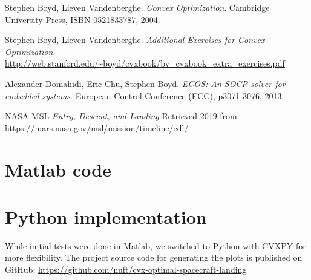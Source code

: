 \documentclass[12pt, letterpaper]{article}
\begin{document}
\begin{thebibliography}{1}

Stephen Boyd, Lieven Vandenberghe.
\textit{Convex Optimization}.
Cambridge University Press, ISBN 0521833787, 2004.

Stephen Boyd, Lieven Vandenberghe.
\textit{Additional Exercises for Convex Optimization}.
\url{http://web.stanford.edu/~boyd/cvxbook/bv_cvxbook_extra_exercises.pdf}

Alexander Domahidi, Eric Chu, Stephen Boyd.
\textit{ECOS: An SOCP solver for embedded systems}.
European Control Conference (ECC), p3071-3076, 2013.

NASA MSL
\textit{Entry, Descent, and Landing}
Retrieved 2019 from \url{https://mars.nasa.gov/msl/mission/timeline/edl/}

\end{thebibliography}

\newpage
\appendix
\section{Matlab code}
\label{matlab_code}


\section{Python implementation}

While initial tests were done in Matlab, we switched to Python with CVXPY for more flexibility.
The project source code for generating the plots is published on GitHub:
\url{https://github.com/nuft/cvx-optimal-spacecraft-landing}
\end{document}
